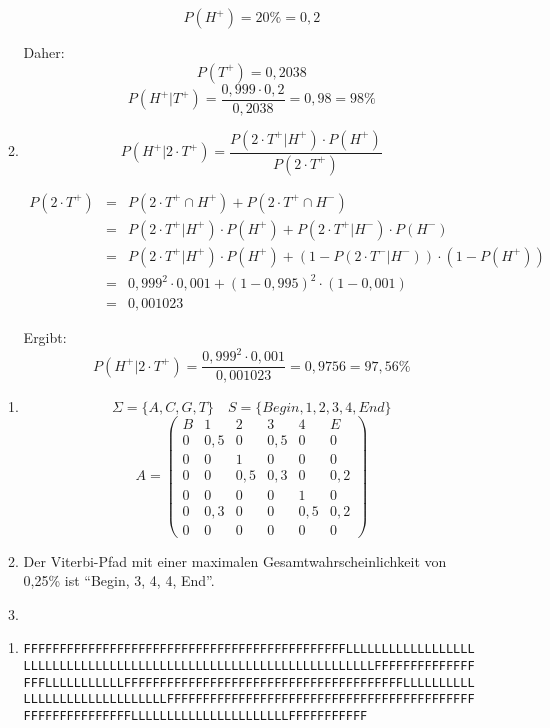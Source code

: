 \documentclass{homework}
\begin{document}
\begin{enumerate}
\begin{enumerate}
$$P(H^+) = 20\% = 0,2$$

Daher:
$$P(T^+) = 0,2038$$
$$P(H^+ | T^+) = \frac{0,999\cdot0,2}{0,2038} = 0,98 = 98\%$$

\item
	$$P(H^+ | 2\cdot T^+) = \frac{P(2\cdot T^+| H^+) \cdot P(H^+)}{P(2\cdot T^+)} $$

\begin{eqnarray*}
P(2\cdot T^+)
& = & P(2\cdot T^+ \cap H^+) + P(2\cdot T^+ \cap H^-) \\ 
& = & P(2\cdot T^+ | H^+) \cdot P(H^+) + P(2\cdot T^+ | H^-) \cdot P(H^-) \\ 
& = & P(2\cdot T^+ | H^+) \cdot P(H^+) + (1-P(2\cdot T^- | H^-)) \cdot (1-P(H^+))\\
& = & 0,999^2 \cdot 0,001 + (1-0,995)^2\cdot(1-0,001)\\
& = & 0,001023
\end{eqnarray*}

Ergibt: \\
$$P(H^+ | 2\cdot T^+) = \frac{0,999^2\cdot0,001}{0,001023} = 0,9756 = 97,56\%$$
\end{enumerate}


\begin{enumerate}
\item $$\Sigma = \{A, C, G, T\} \quad S = \{Begin, 1, 2, 3, 4, End\}$$
$$A = \begin{pmatrix}
B	& 1		& 2		& 3		& 4		& E\\
0	& 0,5	& 0		& 0,5	& 0		& 0\\
0	& 0		& 1		& 0		& 0		& 0\\
0	& 0		& 0,5	& 0,3	& 0		& 0,2\\
0	& 0		& 0		& 0		& 1		& 0\\
0	& 0,3	& 0		& 0		& 0,5	& 0,2\\
0	& 0		& 0		& 0		& 0		& 0
\end{pmatrix}$$

\item Der Viterbi-Pfad mit einer maximalen Gesamtwahrscheinlichkeit von 0,25\%
ist "`Begin, 3, 4, 4, End"'.

\item 

\end{enumerate}


\begin{enumerate}
\item \begin{verbatim}
FFFFFFFFFFFFFFFFFFFFFFFFFFFFFFFFFFFFFFFFFFFFFLLLLLLLLLLLLLLLLLL
LLLLLLLLLLLLLLLLLLLLLLLLLLLLLLLLLLLLLLLLLLLLLLLLLFFFFFFFFFFFFFF
FFFLLLLLLLLLLLFFFFFFFFFFFFFFFFFFFFFFFFFFFFFFFFFFFFFFFLLLLLLLLLL
LLLLLLLLLLLLLLLLLLLLFFFFFFFFFFFFFFFFFFFFFFFFFFFFFFFFFFFFFFFFFFF
FFFFFFFFFFFFFFFLLLLLLLLLLLLLLLLLLLLLLFFFFFFFFFFF
\end{verbatim}
	

\end{enumerate}
\end{enumerate}
\end{document}
